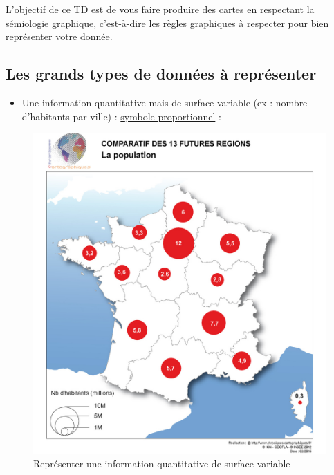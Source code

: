 L'objectif de ce TD est de vous faire produire des cartes en respectant
la sémiologie graphique, c'est-à-dire les règles graphiques à respecter
pour bien représenter votre donnée.

\hypertarget{les-grands-types-de-donnuxe9es-uxe0-repruxe9senter}{%
\subsection{Les grands types de données à
représenter}\label{les-grands-types-de-donnuxe9es-uxe0-repruxe9senter}}

\begin{itemize}
\tightlist
\item
  Une information quantitative mais de surface variable (ex : nombre
  d'habitants par ville) :
  \href{https://www.geoclip.fr/portfolio-item/carte-a-symboles-proportionnels/}{symbole
  proportionnel} :
\end{itemize}

\begin{figure}
\centering
\includegraphics{figures/example_proportion.jpg}
\caption{Représenter une information quantitative de surface variable}
\end{figure}

